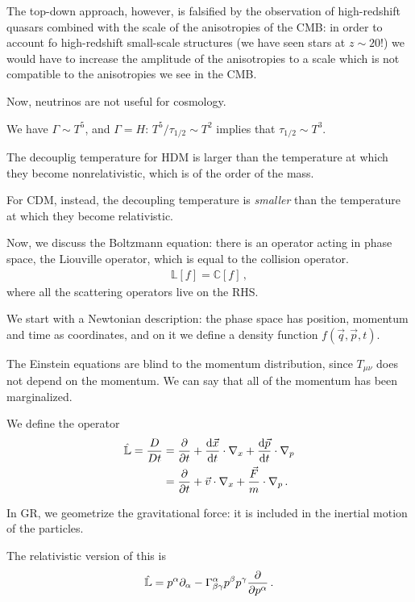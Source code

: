 \documentclass[main.tex]{subfiles}
\begin{document}
The top-down approach, however, is falsified by the observation of high-redshift quasars combined with the scale of the anisotropies of the CMB: in order to account fo high-redshift small-scale structures (we have seen stars at \(z \sim 20\)!) we would have to increase the amplitude of the anisotropies to a scale which is not compatible to the anisotropies we see in the CMB. 

Now, neutrinos are not useful for cosmology. 

We have \(\Gamma \sim T^{5}\), and \(\Gamma = H\): 
\(T^{5} / \tau_{1/2} \sim T^2\) implies that \(\tau_{1/2} \sim T^{3}\). 

The decouplig temperature for HDM is larger than the temperature at which they become nonrelativistic, which is of the order of the mass. 

For CDM, instead, the decoupling temperature is \emph{smaller} than the temperature at which they become relativistic. 

Now, we discuss the Boltzmann equation: there is an operator acting in phase space, the Liouville operator, which is equal to the collision operator.
%
\begin{align}
  \mathbb{L} [f] = \mathbb{C} [f]
\,,
\end{align}
%
where all the scattering operators live on the RHS. 

We start with a Newtonian description: the phase space has position, momentum and time as coordinates, and on it we define a density function \(f(\vec{q}, \vec{p}, t)\). 

The Einstein equations are blind to the momentum distribution, since \(T_{\mu \nu }\) does not depend on the momentum. We can say that all of the momentum has been marginalized. 

We define the operator 
%
\begin{subequations}
\begin{align}
  \hat{\mathbb{L}} = \frac{D}{Dt} &= \pdv{}{t} + \dv{\vec{x}}{t} \cdot \nabla_x + \dv{\vec{p}}{t} \cdot \nabla_p   \\
  &= \pdv{}{t} + \vec{v} \cdot \nabla_x + \frac{\vec{F}}{m} \cdot \nabla_p 
\,. 
\end{align}
\end{subequations}

In GR, we geometrize the gravitational force: it is included in the inertial motion of the particles. 

The relativistic version of this is 
%
\begin{align}
  \hat{\mathbb{L}} = p^{\alpha } \partial_{\alpha } - \Gamma^{\alpha }_{\beta \gamma } p^{\beta } p^{\gamma } \pdv{}{p^{\alpha }}
\,.
\end{align}
%
\end{document}
